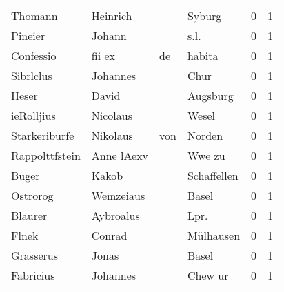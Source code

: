 \begin{center}
\begin{tiny}
\begin{longtabu}{llllrr}
                  Thomann &                           Heinrich &             &                                      Syburg &          0 &         1 \\
                  Pineier &                             Johann &             &                                        s.l. &          0 &         1 \\
                Confessio &                             fii ex &          de &                                      habita &          0 &         1 \\
                Sibrlclus &                           Johannes &             &                                        Chur &          0 &         1 \\
                    Heser &                              David &             &                                    Augsburg &          0 &         1 \\
               ieRolljius &                           Nicolaus &             &                                       Wesel &          0 &         1 \\
            Starkeriburfe &                           Nikolaus &         von &                                      Norden &          0 &         1 \\
           Rappolttfstein &                         Anne lAexv &             &                                      Wwe zu &          0 &         1 \\
                    Buger &                              Kakob &             &                                 Schaffellen &          0 &         1 \\
                 Ostrorog &                          Wemzeiaus &             &                                       Basel &          0 &         1 \\
                  Blaurer &                          Aybroalus &             &                                       Lpr.  &          0 &         1 \\
                    Flnek &                             Conrad &             &                                   Mülhausen &          0 &         1 \\
                Grasserus &                              Jonas &             &                                       Basel &          0 &         1 \\
                Fabricius &                           Johannes &             &                                     Chew ur &          0 &         1 \\

\end{longtabu}
\end{tiny}
\end{center}
